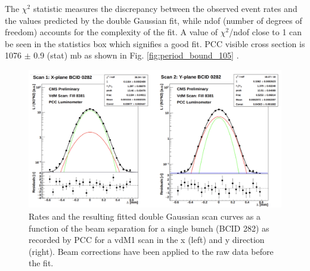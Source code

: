 The $\chi^2$ statistic measures the discrepancy between the observed event rates and the values predicted by the double Gaussian fit, while ndof (number of degrees of freedom) accounts for the complexity of the fit. A value of  $\chi^2$/ndof close to 1 can be seen in the statistics box which signifies a good fit. PCC visible cross section is 1076 $\pm$ 0.9 (stat) mb as shown in Fig. \ref{fig:period_bound_105} \cite{bril2023vdmrecalibration}.


\begin{figure}[!htp]
\centering
\includegraphics[width=1\textwidth]{ashish_thesis/2022_vdM_fit_1.png}
\caption[2022 PCC vdM Fit]{%
  Rates and the resulting fitted double Gaussian scan curves as a function of the beam separation for a single bunch (BCID 282) as recorded by PCC for a vdM1 scan in the x (left) and y direction (right). Beam corrections have been applied to the raw data before the fit.
}
\label{fig:period_bound_50}
\end{figure}

